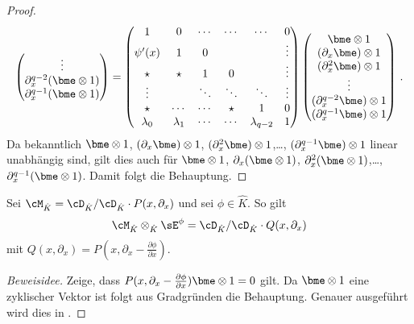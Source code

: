 \begin{proof}
\[\begin{pmatrix}
\vdots\\
\partial_x^{q-2}(\bme\otimes 1)\\
\partial_x^{q-1}(\bme\otimes 1)\\
\end{pmatrix}
=
\begin{pmatrix}
1         & 0         & \cdots & \cdots & \cdots        & 0 \\
\psi'(x)  & 1         & 0      &        &               & \vdots\\
\star     & \star     & 1      & 0      &               & \vdots\\
\vdots    &           & \ddots & \ddots & \ddots        & \vdots\\
\star     & \cdots    & \cdots & \star  & 1             & 0\\
\lambda_0 & \lambda_1 & \cdots & \cdots & \lambda_{q-2} & 1\\
\end{pmatrix}
\begin{pmatrix}
\bme\otimes 1\\
(\partial_x \bme)\otimes 1\\
(\partial_x^{2}\bme)\otimes 1\\
\vdots\\
(\partial_x^{q-2}\bme)\otimes 1\\
(\partial_x^{q-1}\bme)\otimes 1\\
\end{pmatrix}
\,.
\]
Da bekanntlich $\bme\otimes1$, $(\partial_x \bme)\otimes 1$,
$(\partial_x^{2}\bme)\otimes 1$,\dots, $(\partial_x^{q-1}\bme)\otimes 1$ linear
unabhängig sind, gilt dies auch für $\bme\otimes 1$, $\partial_x(\bme\otimes
1)$, $\partial_x^2(\bme\otimes 1)$,\dots, $\partial_x^{q-1}(\bme\otimes 1)$.
Damit folgt die Behauptung.
\end{proof}
\begin{lem} \label{lem:twistRechenregel}
Sei $\cM_{\hat K}=\cD_{\hat K}/\cD_{\hat K}\cdot P(x,\partial_x)$ und sei
$\phi\in \hat K$. So gilt
\[
\cM_{\hat K}\otimes_{\hat K}\sE^{\phi}=\cD_{\hat K}/\cD_{\hat K}\cdot
Q(x,\partial_x)
\]
mit $Q(x,\partial_x)=P(x,\partial_x-\frac{\partial \phi}{\partial x})$.
\end{lem}
\begin{proof}[Beweisidee]
Zeige, dass $P(x,\partial_x-\frac{\partial \phi}{\partial x})\bme\otimes1=0$
gilt. Da $\bme\otimes1$ eine zyklischer Vektor ist folgt aus Gradgründen die
Behauptung. Genauer ausgeführt wird dies in \cite[Seiten 39 bis
44]{DiplHedwig}.
\begin{comment}
\begin{align*}
P(x,\partial_x-\frac{\partial \phi}{\partial x})\bme\otimes1
 &=TODO
\end{align*}
\end{comment}
\end{proof}
